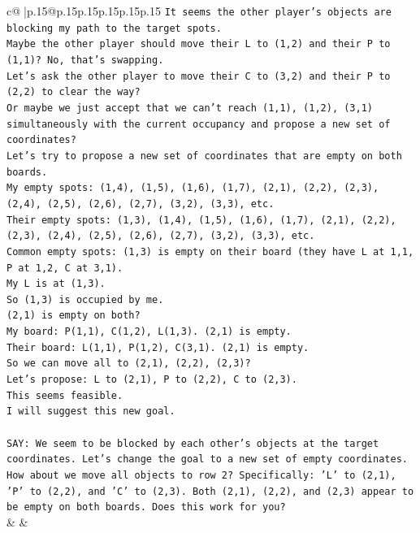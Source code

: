 \documentclass{article}
\begin{document}
{\begin{supertabular}{c@{$\;$}|p{.15\linewidth}@{}p{.15\linewidth}p{.15\linewidth}p{.15\linewidth}p{.15\linewidth}p{.15\linewidth}}
{{{\texttt{It seems the other player's objects are blocking my path to the target spots.} \\
\texttt{Maybe the other player should move their L to (1,2) and their P to (1,1)? No, that's swapping.} \\
\texttt{Let's ask the other player to move their C to (3,2) and their P to (2,2) to clear the way?} \\
\texttt{Or maybe we just accept that we can't reach (1,1), (1,2), (3,1) simultaneously with the current occupancy and propose a new set of coordinates?} \\
\texttt{Let's try to propose a new set of coordinates that are empty on both boards.} \\
\texttt{My empty spots: (1,4), (1,5), (1,6), (1,7), (2,1), (2,2), (2,3), (2,4), (2,5), (2,6), (2,7), (3,2), (3,3), etc.} \\
\texttt{Their empty spots: (1,3), (1,4), (1,5), (1,6), (1,7), (2,1), (2,2), (2,3), (2,4), (2,5), (2,6), (2,7), (3,2), (3,3), etc.} \\
\texttt{Common empty spots: (1,3) is empty on their board (they have L at 1,1, P at 1,2, C at 3,1).} \\
\texttt{My L is at (1,3).} \\
\texttt{So (1,3) is occupied by me.} \\
\texttt{(2,1) is empty on both?} \\
\texttt{My board: P(1,1), C(1,2), L(1,3). (2,1) is empty.} \\
\texttt{Their board: L(1,1), P(1,2), C(3,1). (2,1) is empty.} \\
\texttt{So we can move all to (2,1), (2,2), (2,3)?} \\
\texttt{Let's propose: L to (2,1), P to (2,2), C to (2,3).} \\
\texttt{This seems feasible.} \\
\texttt{I will suggest this new goal.} \\
\\ 
\texttt{SAY: We seem to be blocked by each other's objects at the target coordinates. Let's change the goal to a new set of empty coordinates. How about we move all objects to row 2? Specifically: 'L' to (2,1), 'P' to (2,2), and 'C' to (2,3). Both (2,1), (2,2), and (2,3) appear to be empty on both boards. Does this work for you?} \\
            }
        }
    }
    & & \\ \\


\end{supertabular}}
\end{document}
